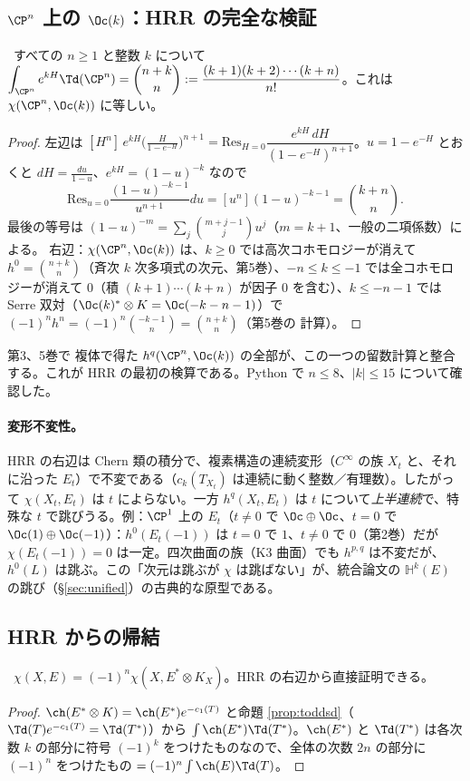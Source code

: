 \subsection{$\CP^n$ 上の $\Oc(k)$：HRR の完全な検証}
\begin{thm}\label{thm:HRRPn}\tP\
すべての $n\ge1$ と整数 $k$ について $\displaystyle\int_{\CP^n}e^{kH}\Td(\CP^n)=\binom{n+k}n:=\frac{(k+1)(k+2)\cdots(k+n)}{n!}$。これは $\chi(\CP^n,\Oc(k))$ に等しい。
\end{thm}
\begin{proof}
左辺は $[H^n]\,e^{kH}\bigl(\frac H{1-e^{-H}}\bigr)^{n+1}=\mathrm{Res}_{H=0}\dfrac{e^{kH}\,dH}{(1-e^{-H})^{n+1}}$。$u=1-e^{-H}$ とおくと $dH=\frac{du}{1-u}$、$e^{kH}=(1-u)^{-k}$ なので
\[
\mathrm{Res}_{u=0}\frac{(1-u)^{-k-1}}{u^{n+1}}du=[u^n](1-u)^{-k-1}=\binom{k+n}{n}.
\]
最後の等号は $(1-u)^{-m}=\sum_j\binom{m+j-1}{j}u^j$（$m=k+1$、一般の二項係数）による。
右辺：$\chi(\CP^n,\Oc(k))$ は、$k\ge0$ では高次コホモロジーが消えて $h^0=\binom{n+k}n$（斉次 $k$ 次多項式の次元、第5巻）、$-n\le k\le-1$ では全コホモロジーが消えて $0$（積 $(k+1)\cdots(k+n)$ が因子 $0$ を含む）、$k\le-n-1$ では Serre 双対（$\Oc(k)^*\otimes K=\Oc(-k-n-1)$）で $(-1)^nh^n=(-1)^n\binom{-k-1}n=\binom{n+k}n$（第5巻の \Cech{} 計算）。
\end{proof}
\noindent 第3、5巻で \Cech{} 複体で得た $h^q(\CP^n,\Oc(k))$ の全部が、この一つの留数計算と整合する。これが HRR の最初の検算である。Python で $n\le8$、$|k|\le15$ について確認した。


\paragraph{変形不変性。}HRR の右辺は Chern 類の積分で、複素構造の連続変形（$C^\infty$ の族 $X_t$ と、それに沿った $E_t$）で不変である（$c_k(T_{X_t})$ は連続に動く整数／有理数）。したがって $\chi(X_t,E_t)$ は $t$ によらない。一方 $h^q(X_t,E_t)$ は $t$ について\emph{上半連続}で、特殊な $t$ で跳びうる。例：$\CP^1$ 上の $E_t$（$t\ne0$ で $\Oc\oplus\Oc$、$t=0$ で $\Oc(1)\oplus\Oc(-1)$）：$h^0(E_t(-1))$ は $t=0$ で $1$、$t\ne0$ で $0$（第2巻）だが $\chi(E_t(-1))=0$ は一定。四次曲面の族（K3 曲面）でも $h^{p,q}$ は不変だが、$h^0(L)$ は跳ぶ。この「次元は跳ぶが $\chi$ は跳ばない」が、統合論文の $\mathbb H^k(E)$ の跳び（\S\ref{sec:unified}）の古典的な原型である。
\subsection{HRR からの帰結}
\begin{prop}[Serre 双対と HRR]\label{prop:SDHRR}\tP\
$\chi(X,E)=(-1)^n\chi(X,E^*\otimes K_X)$。HRR の右辺から直接証明できる。
\end{prop}
\begin{proof}
$\ch(E^*\otimes K)=\ch(E^*)e^{-c_1(T)}$ と命題 \ref{prop:toddsd}（$\Td(T)e^{-c_1(T)}=\Td(T^*)$）から $\int\ch(E^*)\Td(T^*)$。$\ch(E^*)$ と $\Td(T^*)$ は各次数 $k$ の部分に符号 $(-1)^k$ をつけたものなので、全体の次数 $2n$ の部分に $(-1)^n$ をつけたもの $=(-1)^n\int\ch(E)\Td(T)$。
\end{proof}

